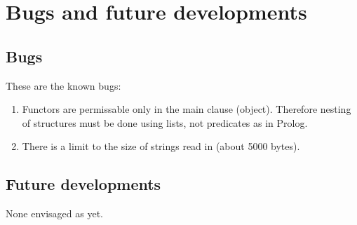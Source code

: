 \chapter{Bugs and future developments}
%
\setfooter{\thepage}{}{}{}{}{\thepage}

\section{Bugs}

These are the known bugs:

\begin{enumerate}
\item Functors are permissable only in the main clause (object).
Therefore nesting of structures must be done using lists, not predicates
as in Prolog.
\item There is a limit to the size of strings read in (about 5000 bytes).
\end{enumerate}

\section{Future developments}

None envisaged as yet.



%
%
\setfooter{\thepage}{}{}{}{}{\thepage}
\printindex

